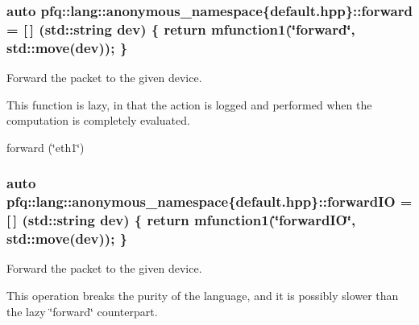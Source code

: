 \hypertarget{namespacepfq_1_1lang_1_1anonymous__namespace_02default_8hpp_03_aae08247030fea0f5e398b0a03d382257}{
\subsubsection[{forward}]{\setlength{\rightskip}{0pt plus 5cm}auto pfq\+::lang\+::anonymous\+\_\+namespace\{default.\+hpp\}\+::forward = \mbox{[}$\,$\mbox{]} (std\+::string dev) \{ return {\bf mfunction1}(\char`\"{}forward\char`\"{}, std\+::move(dev)); \}}}\label{namespacepfq_1_1lang_1_1anonymous__namespace_02default_8hpp_03_aae08247030fea0f5e398b0a03d382257}


Forward the packet to the given device. 

This function is lazy, in that the action is logged and performed when the computation is completely evaluated.

forward (\char`\"{}eth1\char`\"{}) \hypertarget{namespacepfq_1_1lang_1_1anonymous__namespace_02default_8hpp_03_a3fb6ec42e38c3329534ea3a7024fd967}{
\subsubsection[{forward\+I\+O}]{\setlength{\rightskip}{0pt plus 5cm}auto pfq\+::lang\+::anonymous\+\_\+namespace\{default.\+hpp\}\+::forward\+I\+O = \mbox{[}$\,$\mbox{]} (std\+::string dev) \{ return {\bf mfunction1}(\char`\"{}forward\+I\+O\char`\"{}, std\+::move(dev)); \}}}\label{namespacepfq_1_1lang_1_1anonymous__namespace_02default_8hpp_03_a3fb6ec42e38c3329534ea3a7024fd967}


Forward the packet to the given device. 

This operation breaks the purity of the language, and it is possibly slower than the lazy \char`\"{}forward\char`\"{} counterpart.

